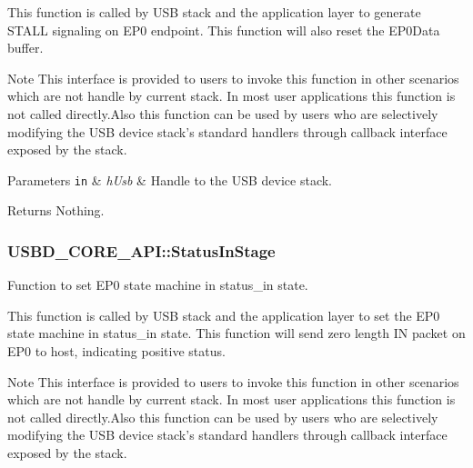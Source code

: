 This function is called by U\-S\-B stack and the application layer to generate S\-T\-A\-L\-L signaling on E\-P0 endpoint. This function will also reset the E\-P0\-Data buffer. \par
\begin{DoxyNote}{Note}
This interface is provided to users to invoke this function in other scenarios which are not handle by current stack. In most user applications this function is not called directly.\-Also this function can be used by users who are selectively modifying the U\-S\-B device stack's standard handlers through callback interface exposed by the stack.
\end{DoxyNote}

\begin{DoxyParams}[1]{Parameters}
\mbox{\tt in}  & {\em h\-Usb} & Handle to the U\-S\-B device stack. \\
\hline
\end{DoxyParams}
\begin{DoxyReturn}{Returns}
Nothing. 
\end{DoxyReturn}
\hypertarget{structUSBD__CORE__API_a9b57a8360ef4b3acd63ede5773813b36}{
\subsubsection[{Status\-In\-Stage}]{ U\-S\-B\-D\-\_\-\-C\-O\-R\-E\-\_\-\-A\-P\-I\-::\-Status\-In\-Stage}}\label{structUSBD__CORE__API_a9b57a8360ef4b3acd63ede5773813b36}
Function to set E\-P0 state machine in status\-\_\-in state.

This function is called by U\-S\-B stack and the application layer to set the E\-P0 state machine in status\-\_\-in state. This function will send zero length I\-N packet on E\-P0 to host, indicating positive status. \par
\begin{DoxyNote}{Note}
This interface is provided to users to invoke this function in other scenarios which are not handle by current stack. In most user applications this function is not called directly.\-Also this function can be used by users who are selectively modifying the U\-S\-B device stack's standard handlers through callback interface exposed by the stack.
\end{DoxyNote}


